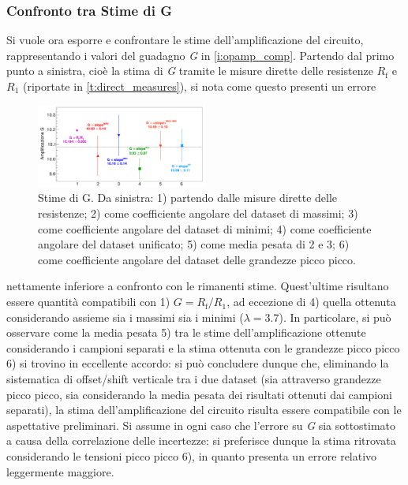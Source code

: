 \documentclass[a4paper,11pt]{article} %
\begin{document}

\subsubsection{Confronto tra Stime di G}
 Si vuole ora esporre e confrontare le stime dell'amplificazione del circuito, rappresentando i valori del guadagno
\textit{G} in \autoref{i:opamp_comp}. Partendo dal primo punto a sinistra, cioè la stima di \textit{G} tramite le misure
dirette delle resistenze $R_{\text{f}}$ e $R_{1}$ (riportate in \autoref{t:direct_measures}), si nota come questo
presenti un errore 

\begin{figure}
	\centering
	\includegraphics[width=0.5\textwidth]{../Plots/Report_Plots/opamp_comp_BIG.png}
	\caption{\footnotesize Stime di G. Da sinistra: 1) partendo dalle misure dirette delle resistenze; 2) come
	coefficiente angolare del dataset di massimi; 3) come coefficiente angolare del dataset di minimi; 4) come
	coefficiente angolare del dataset unificato; 5) come media pesata di 2 e 3; 6) come coefficiente angolare del
	dataset delle grandezze picco picco.}
	\label{i:opamp_comp}
\end{figure}

\noindent nettamente inferiore a confronto con le rimanenti stime. Quest'ultime risultano essere quantità compatibili
con 1) $G=R_{\text{f}}/R_{1}$, ad eccezione di 4) quella ottenuta considerando assieme sia i massimi sia i minimi
($\lambda = 3.7$). In particolare, si può osservare come la media pesata 5) tra le stime dell'amplificazione ottenute
considerando i campioni separati e la stima ottenuta con le grandezze picco picco 6) si trovino in eccellente accordo:
si può concludere dunque che, eliminando la sistematica di offset/shift verticale tra i due dataset (sia attraverso
grandezze picco picco, sia considerando la media pesata dei risultati ottenuti dai campioni separati), la stima
dell'amplificazione del circuito risulta essere compatibile con le aspettative preliminari. Si assume in ogni caso che
l'errore su \textit{G} sia sottostimato a causa della correlazione delle incertezze: si preferisce dunque la stima
ritrovata considerando le tensioni picco picco 6), in quanto presenta un errore relativo leggermente maggiore.
\end{document}
